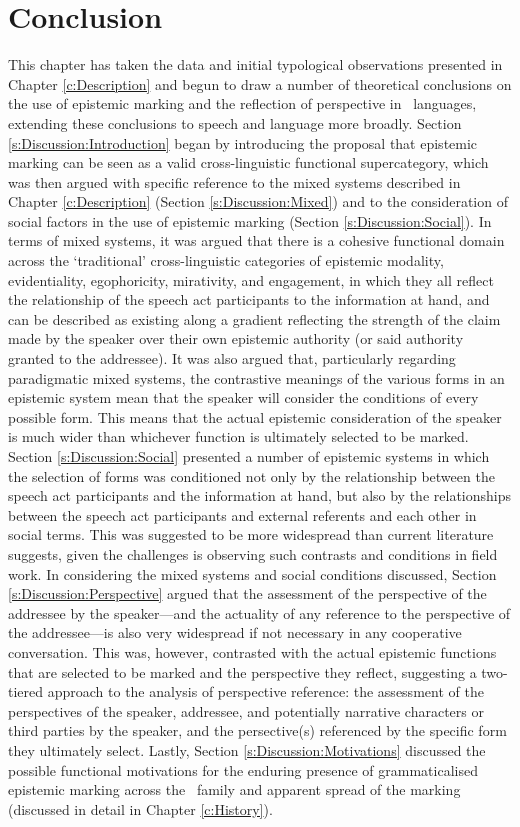 \section{Conclusion}
This chapter has taken the data and initial typological observations presented in Chapter \ref{c:Description} and begun to draw a number of theoretical conclusions on the use of epistemic marking and the reflection of perspective in \lfam\ languages, extending these conclusions to speech and language more broadly. Section \ref{s:Discussion:Introduction} began by introducing the proposal that epistemic marking can be seen as a valid cross-linguistic functional supercategory, which was then argued with specific reference to the mixed systems described in Chapter \ref{c:Description} (Section \ref{s:Discussion:Mixed}) and to the consideration of social factors in the use of epistemic marking (Section \ref{s:Discussion:Social}). In terms of mixed systems, it was argued that there is a cohesive functional domain across the `traditional' cross-linguistic categories of epistemic modality, evidentiality, egophoricity, mirativity, and engagement, in which they all reflect the relationship of the speech act participants to the information at hand, and can be described as existing along a gradient reflecting the strength of the claim made by the speaker over their own epistemic authority (or said authority granted to the addressee). It was also argued that, particularly regarding paradigmatic mixed systems, the contrastive meanings of the various forms in an epistemic system mean that the speaker will consider the conditions of every possible form. This means that the actual epistemic consideration of the speaker is much wider than whichever function is ultimately selected to be marked. Section \ref{s:Discussion:Social} presented a number of epistemic systems in which the selection of forms was conditioned not only by the relationship between the speech act participants and the information at hand, but also by the relationships between the speech act participants and external referents and each other in social terms. This was suggested to be more widespread than current literature suggests, given the challenges is observing such contrasts and conditions in field work. In considering the mixed systems and social conditions discussed, Section \ref{s:Discussion:Perspective} argued that the assessment of the perspective of the addressee by the speaker---and the actuality of any reference to the perspective of the addressee---is also very widespread if not necessary in any cooperative conversation. This was, however, contrasted with the actual epistemic functions that are selected to be marked and the perspective they reflect, suggesting a two-tiered approach to the analysis of perspective reference: the assessment of the perspectives of the speaker, addressee, and potentially narrative characters or third parties by the speaker, and the persective(s) referenced by the specific form they ultimately select. Lastly, Section \ref{s:Discussion:Motivations} discussed the possible functional motivations for the enduring presence of grammaticalised epistemic marking across the \lfam\ family and apparent spread of the marking (discussed in detail in Chapter \ref{c:History}). 